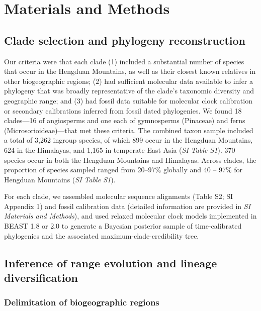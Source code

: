 \section{Materials and Methods}

\subsection{Clade selection and phylogeny reconstruction}

Our criteria were that each clade (1) included a substantial number of species that occur in the Hengduan Mountains, as well as their closest known relatives in other biogeographic regions; (2) had sufficient molecular data available to infer a phylogeny that was broadly representative of the clade's taxonomic diversity and geographic range; and (3) had fossil data suitable for molecular clock calibration or secondary calibrations inferred from fossil dated phylogenies. We found 18 clades---16 of angiosperms and one each of gymnosperms (Pinaceae) and ferns (Microsorioideae)---that met these criteria. The combined taxon sample included a total of 3,262 ingroup species, of which 899 occur in the Hengduan Mountains, 624 in the Himalayas, and 1,165 in temperate East Asia (\textit{SI Table S1}). 370 species occur in both the Hengduan Mountains and Himalayas. Across clades, the proportion of species sampled ranged from 20--97\% globally and 40 -- 97\% for Hengduan Mountains (\textit{SI Table S1}).

For each clade, we assembled molecular sequence alignments (Table S2; SI Appendix 1) and fossil calibration data (detailed information are provided in \textit{SI Materials and Methods}), and used relaxed molecular clock models implemented in BEAST 1.8 \citep{Drummond2012} or 2.0 \citep{Bouckaert2014} to generate a Bayesian posterior sample of time-calibrated phylogenies and the associated maximum-clade-credibility tree. 


\subsection{Inference of range evolution and lineage diversification}

\subsubsection{Delimitation of biogeographic regions}

